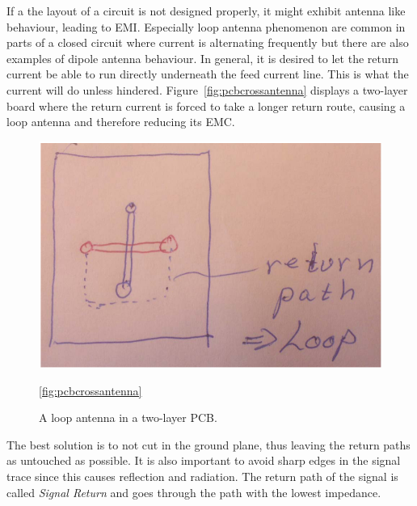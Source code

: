 If a the layout of a circuit is not designed properly, it might exhibit antenna
like behaviour, leading to EMI. Especially loop antenna phenomenon are common in
parts of a closed circuit where current is alternating frequently but there are
also examples of dipole antenna behaviour. In general, it is desired to let the
return current be able to run directly underneath the feed current line. This is
what the current will do unless hindered. Figure~\ref{fig:pcbcrossantenna}
displays a two-layer board where the return current is forced to take a longer
return route, causing a loop antenna and therefore reducing its EMC.
\begin{figure}[H]
\centering
\includegraphics[scale=0.7]{./figures/FIG_pcbcrossantenna}
\caption{A loop antenna in a two-layer PCB.}
\ref{fig:pcbcrossantenna}
\end{figure}
The best solution is to not cut in the ground plane, thus leaving the return
paths as untouched as possible. It is also important to avoid sharp edges in the
signal trace since this causes reflection and radiation. The return path of the
signal is called \textit{Signal Return} and goes through the path with the
lowest impedance.

